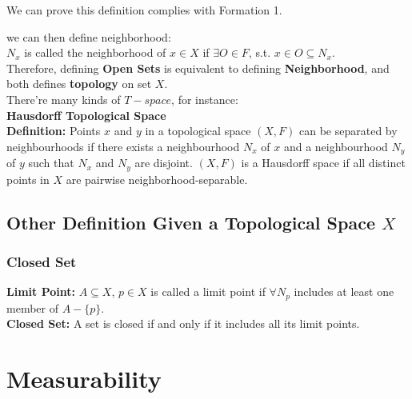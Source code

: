 \documentclass[a4paper, 12pt]{article}
\begin{document}
\indent We can prove this definition complies with Formation 1.
\newpage

\indent we can then define neighborhood:\\
$N_x$ is called the neighborhood of $x \in X$ if $\exists O \in F$, s.t. $x \in O \subseteq N_x$.\\
\indent Therefore, defining \textbf{Open Sets} is equivalent to defining \textbf{Neighborhood}, and both defines \textbf{topology} on set $X$.
\\ \indent There're many kinds of $T-space$, for instance:\\
\textbf{Hausdorff Topological Space}\\
\indent \textbf{Definition: }Points $x$ and $y$ in a topological space $(X, F)$ can be separated by neighbourhoods if there exists a neighbourhood $N_x$ of $x$ and a neighbourhood $N_y$ of $y$ such that $N_x$ and $N_y$ are disjoint. $(X, F)$ is a Hausdorff space if all distinct points in $X$ are pairwise neighborhood-separable.
\subsection{Other Definition Given a Topological Space $X$}
\subsubsection{Closed Set}
\textbf{Limit Point: }$A \subseteq X$, $p \in X$ is called a limit point if $\forall N_p$ includes at least one member of $A - \{p\}$.\\
\indent \textbf{Closed Set: } A set is closed if and only if it includes all its limit points.

\section{Measurability}
\end{document}

